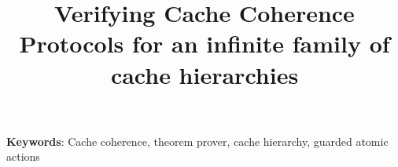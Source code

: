 
\title{Verifying Cache Coherence Protocols for an infinite family of cache hierarchies}




\author{
}

\date{}

\maketitle %


\begin{abstract}

\end{abstract}


\centerline{\footnotesize {\bf Keywords}: Cache coherence, theorem prover, cache hierarchy, guarded atomic actions}



